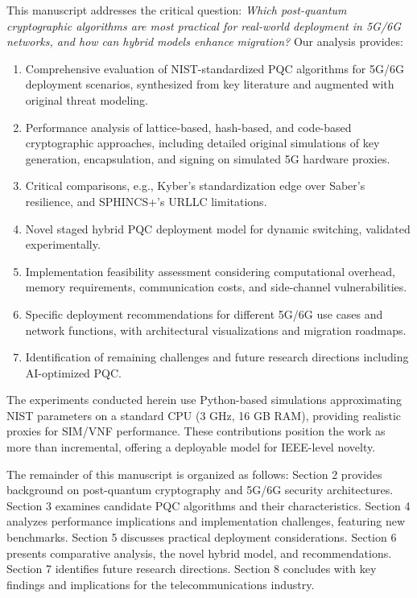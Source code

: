 \documentclass[11pt,a4paper]{article}
\begin{document}
This manuscript addresses the critical question: \emph{Which post-quantum cryptographic algorithms are most practical for real-world deployment in 5G/6G networks, and how can hybrid models enhance migration?} Our analysis provides:

\begin{enumerate}
    \item Comprehensive evaluation of NIST-standardized PQC algorithms for 5G/6G deployment scenarios, synthesized from key literature and augmented with original threat modeling.
    \item Performance analysis of lattice-based, hash-based, and code-based cryptographic approaches, including detailed original simulations of key generation, encapsulation, and signing on simulated 5G hardware proxies.
    \item Critical comparisons, e.g., Kyber's standardization edge over Saber's resilience, and SPHINCS+'s URLLC limitations.
    \item Novel staged hybrid PQC deployment model for dynamic switching, validated experimentally.
    \item Implementation feasibility assessment considering computational overhead, memory requirements, communication costs, and side-channel vulnerabilities.
    \item Specific deployment recommendations for different 5G/6G use cases and network functions, with architectural visualizations and migration roadmaps.
    \item Identification of remaining challenges and future research directions including AI-optimized PQC.
\end{enumerate}

The experiments conducted herein use Python-based simulations approximating NIST parameters on a standard CPU (3 GHz, 16 GB RAM), providing realistic proxies for SIM/VNF performance. These contributions position the work as more than incremental, offering a deployable model for IEEE-level novelty.

The remainder of this manuscript is organized as follows: Section 2 provides background on post-quantum cryptography and 5G/6G security architectures. Section 3 examines candidate PQC algorithms and their characteristics. Section 4 analyzes performance implications and implementation challenges, featuring new benchmarks. Section 5 discusses practical deployment considerations. Section 6 presents comparative analysis, the novel hybrid model, and recommendations. Section 7 identifies future research directions. Section 8 concludes with key findings and implications for the telecommunications industry.
\end{document}
